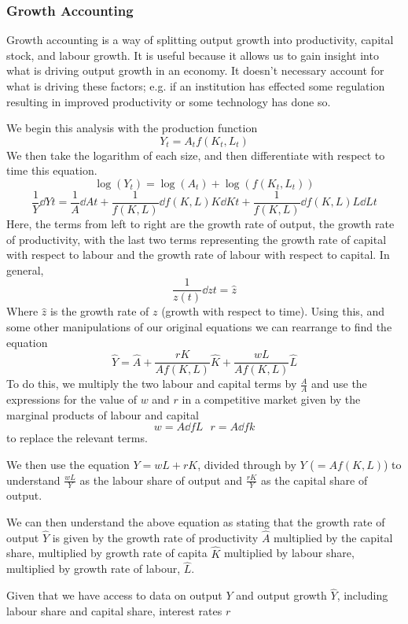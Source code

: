 \documentclass[12pt]{report}
\begin{document}
\begin{flushleft}
\subsubsection*{Growth Accounting}

Growth accounting is a way of splitting output growth into productivity,
capital stock, and labour growth. It is useful because it allows us to gain
insight into what is driving output growth in an economy. It doesn't necessary
account for what is driving these factors; e.g. if an institution has effected
some regulation resulting in improved productivity or some technology has done
so. \par
We begin this analysis with the production function
\[Y_t = A_tf(K_t, L_t)\]
We then take the logarithm of each size, and then differentiate with respect to
time this equation.
\[\log(Y_t) = \log(A_t) + \log(f(K_t, L_t))\]
\[\frac{1}{Y}\dd{Y}{t} = \frac{1}{A}\dd{A}{t} 
+ \frac{1}{f(K, L)}\dd{f(K, L)}{K}\dd{K}{t} 
+ \frac{1}{f(K, L)}\dd{f(K, L)}{L}\dd{L}{t}\]
Here, the terms from left to right are the growth rate of output, the growth
rate of productivity, with the last two terms representing the growth rate of
capital with respect to labour and the growth rate of labour with respect to
capital. In general,
\[\frac{1}{z(t)} \dd{z}{t} = \hat{z}\]
Where \(\hat{z}\) is the growth rate of \(z\) (growth with respect to time).
Using this, and some other manipulations of our original equations we can
rearrange to find the equation
\[\hat{Y} = \hat{A} + \frac{rK}{Af(K, L)}\hat{K} + \frac{wL}{Af(K, L)}\hat{L}\]
To do this, we multiply the two labour and capital terms by \(\frac{A}{A}\) and
use the expressions for the value of \(w\) and \(r\) in a competitive market
given by the marginal products of labour and capital
\[w = A \dd{f}{L}\:\:\:r = A \dd{f}{k}\]
to replace the relevant terms.
\par
We then use the equation \(Y = wL + rK\), divided through by 
\(Y\) (\(= Af(K, L)\)) to
understand \(\frac{wL}{Y}\) as the labour share of output and \(\frac{rK}{Y}\)
as the capital share of output. \par
We can then understand the above equation as stating that the growth rate of
output \(\hat{Y}\) is given by the growth rate of productivity \(\hat{A}\)
multiplied by the capital share, multiplied by growth rate of capita
\(\hat{K}\) multiplied by labour share, multiplied by growth rate of labour,
\(\hat{L}\). \par
Given that we have access to data on output \(Y\) and output growth
\(\hat{Y}\), including labour share and capital share, interest rates \(r\)

\end{flushleft}
\end{document}
